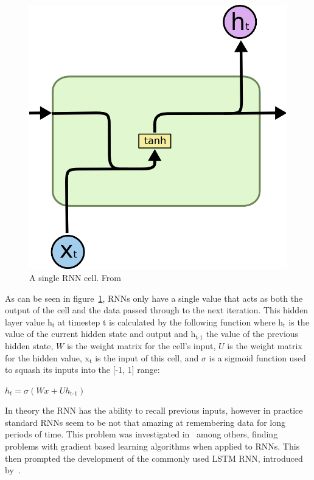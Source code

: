 \begin{figure}
	\begin{center}
		\includegraphics[scale=0.5]{rnn/rnn_cell}
	\end{center}
	\caption{A single RNN cell. From~\cite{SimpleRNN2015}\label{fig:rnn_cell}}
\end{figure}

As can be seen in figure~\ref{fig:rnn_cell}, RNNs only have a single value that acts as both the output of the cell and the data passed through to the next iteration. This hidden layer value h\(_{\text{t}}\) at timestep t is calculated by the following function where h\(_{\text{t}}\) is the value of the current hidden state and output and h\(_{\text{t-1}}\) the value of the previous hidden state, \(W\) is the weight matrix for the cell's input, \(U\) is the weight matrix for the hidden value, x\(_{\text{t}}\) is the input of this cell, and \(\sigma \) is a sigmoid function used to squash its inputs into the [-1, 1] range:

\( h_t = \sigma(Wx + Uh_\text{t-1}) \)

In theory the RNN has the ability to recall previous inputs, however in practice standard RNNs seem to be not that amazing at remembering data for long periods of time. This problem was investigated in~\cite{bengio1994learning} among others, finding problems with gradient based learning algorithms when applied to RNNs. This then prompted the development of the commonly used LSTM RNN, introduced by~\cite{hochreiter1997long}\@.

